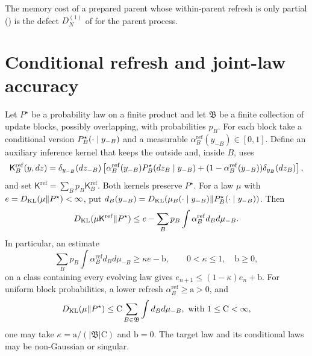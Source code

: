 The memory cost of a prepared parent whose within-parent refresh is only partial
() is the defect $D^{(1)}_N$ of
 for the parent process.

\section{Conditional refresh and joint-law accuracy}
\label{sec:rg-conditional-refresh-accuracy}

Let $P^\star$ be a probability law on a finite product and let
$\mathfrak B$ be a finite collection of update blocks, possibly overlapping,
with probabilities $p_B$. For each block take a conditional version
$P^\star_B(\cdot\mid y_{-B})$ and a measurable
$\alpha^{\mathrm{ref}}_B(y_{-B})\in[0,1]$. Define an auxiliary inference
kernel that keeps the outside and, inside $B$, uses
\begin{equation}
\mathsf K_B^{\mathrm{ref}}(y,dz)
=\delta_{y_{-B}}(dz_{-B})
\left[\alpha^{\mathrm{ref}}_B(y_{-B})P^\star_B(dz_B\mid y_{-B})
+(1-\alpha^{\mathrm{ref}}_B(y_{-B}))\delta_{y_B}(dz_B)\right],
\label{eq:rg-conditional-refresh-kernel}
\end{equation}
and set $\mathsf K^{\mathrm{ref}}=\sum_Bp_B\mathsf K_B^{\mathrm{ref}}$.
Both kernels preserve $P^\star$. For a law $\mu$ with
$e=D_{\mathrm{KL}}(\mu\Vert P^\star)<\infty$, put
$d_B(y_{-B})=D_{\mathrm{KL}}(\mu_B(\cdot\mid y_{-B})\Vert
P^\star_B(\cdot\mid y_{-B}))$. Then
\begin{equation}
D_{\mathrm{KL}}(\mu\mathsf K^{\mathrm{ref}}\Vert P^\star)
\leq e-\sum_Bp_B\int\alpha^{\mathrm{ref}}_Bd_B d\mu_{-B}.
\label{eq:rg-conditional-refresh-dissipation}
\end{equation}
In particular, an estimate
\begin{equation}
\sum_Bp_B\int\alpha^{\mathrm{ref}}_Bd_B d\mu_{-B}
\geq\kappa e-\mathrm b,\qquad 0<\kappa\leq1,\quad \mathrm b\geq0,
\label{eq:rg-weighted-entropy-hypothesis}
\end{equation}
on a class containing every evolving law gives
$e_{n+1}\leq(1-\kappa)e_n+\mathrm b$. For uniform block probabilities,
a lower refresh $\alpha^{\mathrm{ref}}_B\geq\mathrm a>0$, and
\begin{equation}
D_{\mathrm{KL}}(\mu\Vert P^\star)\leq
\mathrm C\sum_{B\in\mathfrak B}\int d_B d\mu_{-B},
\text{ with }1\leq\mathrm C<\infty,
\label{eq:rg-block-entropy-factorization}
\end{equation}
one may take $\kappa=\mathrm a/(|\mathfrak B|\mathrm C)$ and $\mathrm b=0$.
The target law and its conditional laws may be non-Gaussian or singular.

